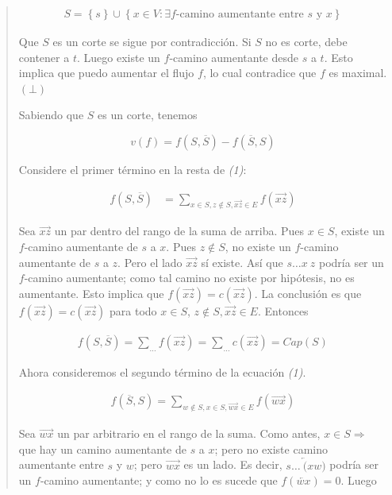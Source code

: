 \documentclass[a4paper, 12pt]{article}
\begin{document}
\begin{quote}
\begin{align*}
    S = \left\{ s \right\} \cup \left\{ x \in V : \exists f\text{-camino
    aumentante entre $s$ y $x$} \right\} 
\end{align*}

Que $S$ es un corte se sigue por contradicción. Si $S$ no es corte, debe
contener a $t$. Luego existe un $f$-camino aumentante desde $s$ a $t$. Esto
implica que puedo aumentar el flujo $f$, lo cual contradice que $f$ es maximal.
$(\bot)$

Sabiendo que $S$ es un corte, tenemos 

\begin{equation}
    v(f) = f(S, \overline{S}) - f(\overline{S}, S)
\end{equation}

Considere el primer término en la resta de \textit{(1)}:

\begin{align*}
    f(S, \overline{S}) &= \sum_{x \in S, z \not\in S, \overrightarrow{xz} \in E}
    f(\overrightarrow{xz})
\end{align*}

Sea $\overrightarrow{xz}$ un par dentro del rango de la suma de arriba. Pues $x
\in S$, existe un $f$-camino aumentante de $s$ a $x$. Pues $z \not\in S$, no
existe un $f$-camino aumentante de $s$ a $z$. Pero el lado $\overrightarrow{xz}$
sí existe. Así que $s \ldots x ~ z$ podría ser un $f$-camino aumentante; como
tal camino no existe por hipótesis, no es aumentante. Esto implica que
$f(\overrightarrow{xz}) = c(\overrightarrow{xz})$. La conclusión es que
$f(\overrightarrow{xz}) = c(\overrightarrow{xz})$ para todo $x \in S$, $z
\not\in S, \overrightarrow{xz}\in E$. Entonces 

\begin{align*}
    f(S, \overline{S}) = \sum_{\ldots} f(\overrightarrow{xz}) = \sum_{\ldots}
    c(\overrightarrow{xz}) = Cap(S)
\end{align*}

Ahora consideremos el segundo término de la ecuación \textit{(1)}. 

\begin{align*}
    f(\overline{S}, S) = \sum_{w \not\in S, x \in S, \overrightarrow{wx} \in E}
    f(\overrightarrow{wx})
\end{align*}

Sea $\overrightarrow{wx}$ un par arbitrario en el rango de la suma. Como antes,
$x \in S \Rightarrow$ que hay un camino aumentante de $s$ a $x$; pero no existe
camino aumentante entre $s$ y $w$; pero $\overrightarrow{wx}$ es un lado. Es
decir, $s \ldots ~ \overleftarrow(xw)$ podría ser un $f$-camino aumentante; y
como no lo es sucede que $f(\overleftarrow{wx}) = 0$. Luego 


\end{quote}
\end{document}
